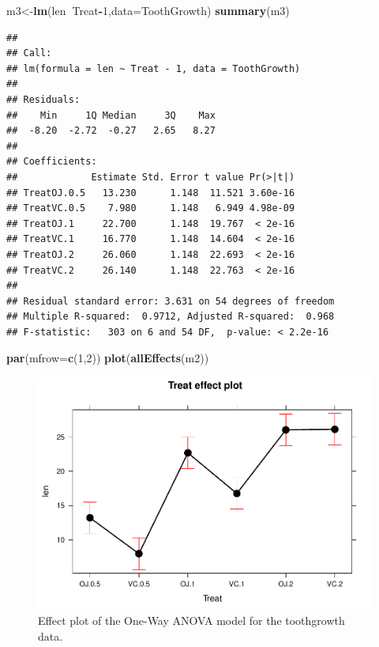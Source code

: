\documentclass[]{book}
\newenvironment{Shaded}{\begin{snugshade}}{\end{snugshade}}
\newcommand{\KeywordTok}[1]{\textcolor[rgb]{0.13,0.29,0.53}{\textbf{#1}}}
\newcommand{\DataTypeTok}[1]{\textcolor[rgb]{0.13,0.29,0.53}{#1}}
\newcommand{\DecValTok}[1]{\textcolor[rgb]{0.00,0.00,0.81}{#1}}
\newcommand{\OperatorTok}[1]{\textcolor[rgb]{0.81,0.36,0.00}{\textbf{#1}}}
\newcommand{\NormalTok}[1]{#1}
\theoremstyle{definition}
\theoremstyle{definition}
\theoremstyle{remark}
\begin{document}
\begin{Shaded}
\begin{Highlighting}[]
\NormalTok{m3<-}\KeywordTok{lm}\NormalTok{(len}\OperatorTok{~}\NormalTok{Treat}\OperatorTok{-}\DecValTok{1}\NormalTok{,}\DataTypeTok{data=}\NormalTok{ToothGrowth)}
\KeywordTok{summary}\NormalTok{(m3)}
\end{Highlighting}
\end{Shaded}

\begin{verbatim}
## 
## Call:
## lm(formula = len ~ Treat - 1, data = ToothGrowth)
## 
## Residuals:
##    Min     1Q Median     3Q    Max 
##  -8.20  -2.72  -0.27   2.65   8.27 
## 
## Coefficients:
##             Estimate Std. Error t value Pr(>|t|)
## TreatOJ.0.5   13.230      1.148  11.521 3.60e-16
## TreatVC.0.5    7.980      1.148   6.949 4.98e-09
## TreatOJ.1     22.700      1.148  19.767  < 2e-16
## TreatVC.1     16.770      1.148  14.604  < 2e-16
## TreatOJ.2     26.060      1.148  22.693  < 2e-16
## TreatVC.2     26.140      1.148  22.763  < 2e-16
## 
## Residual standard error: 3.631 on 54 degrees of freedom
## Multiple R-squared:  0.9712, Adjusted R-squared:  0.968 
## F-statistic:   303 on 6 and 54 DF,  p-value: < 2.2e-16
\end{verbatim}

\begin{Shaded}
\begin{Highlighting}[]
\KeywordTok{par}\NormalTok{(}\DataTypeTok{mfrow=}\KeywordTok{c}\NormalTok{(}\DecValTok{1}\NormalTok{,}\DecValTok{2}\NormalTok{))}
\KeywordTok{plot}\NormalTok{(}\KeywordTok{allEffects}\NormalTok{(m2))}
\end{Highlighting}
\end{Shaded}

\begin{figure}
\centering
\includegraphics{03-oneWayAnova_files/figure-latex/Figure3-17-1.pdf}
\caption{\label{fig:Figure3-17}Effect plot of the One-Way ANOVA model for the toothgrowth
data.}
\end{figure}
\end{document}
